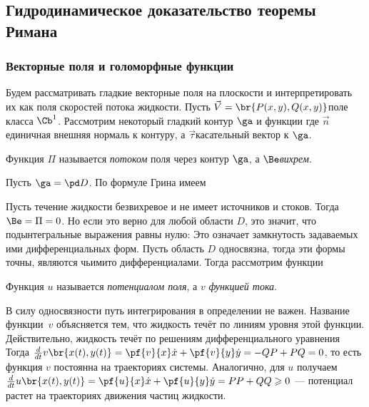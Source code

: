 \documentclass[a4paper]{article}
\begin{document}
\subsection{Гидродинамическое доказательство теоремы Римана}

\subsubsection{Векторные поля и голоморфные функции}

Будем рассматривать гладкие векторные поля на плоскости и интерпретировать их как
поля скоростей потока жидкости.
Пусть $\vec V = \br{P(x,y),Q(x,y)}$\т поле класса $\Cb^1$.
Рассмотрим некоторый гладкий контур $\ga$ и функции
где $\vec n$\т единичная внешняя нормаль к контуру, а $\vec \tau$\т касательный вектор к $\ga$.

\begin{df}
Функция $\Pi$ называется \emph{потоком} поля через контур $\ga$, а $\Be$\т \emph{вихрем}.
\end{df}

Пусть $\ga = \pd D$. По формуле Грина имеем

Пусть течение жидкости безвихревое и не имеет источников и стоков. Тогда $\Be=\Pi=0$.
Но если это верно для любой области $D$, это значит, что подынтегральные выражения равны нулю:
Это означает замкнутость задаваемых ими
дифференциальных форм. Пусть область $D$ односвязна, тогда эти формы точны,  являются
чьими\д то дифференциалами. Тогда рассмотрим функции

\begin{df}
Функция $u$ называется \emph{потенциалом поля}, а $v$\т
\emph{функцией тока}.
\end{df}

В силу односвязности путь интегрирования в определении не важен. Название функции~$v$
объясняется тем, что жидкость течёт по линиям уровня этой функции. Действительно,
жидкость течёт по решениям дифференциального уравнения
Тогда $\frac{d}{dt}v\br{x(t),y(t)} = \pf{v}{x}\dot x + \pf{v}{y} \dot y = -QP + PQ = 0$,
то есть функция $v$ постоянна на траекториях системы. Аналогично, для $u$ получаем
$\frac{d}{dt}u\br{x(t),y(t)} = \pf{u}{x}\dot x + \pf{u}{y} \dot y = PP + QQ \geqslant 0$ ---
потенциал растет на траекториях движения частиц жидкости.
\end{document}
